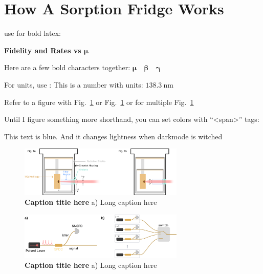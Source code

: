 \documentclass[11pt]{caltech_thesis} %
\begin{document}
\hypertarget{how-a-sorption-fridge-works}{%
\section{How A Sorption Fridge
Works}\label{how-a-sorption-fridge-works}}

use \boldsymbol for bold latex:

\textbf{Fidelity and Rates vs \(\boldsymbol \mu\)}

Here are a few bold characters together:
\(\boldsymbol{\mu \quad \beta \quad \gamma}\)

For units, use : This is a number with units:
\(138.3~\mathrm{nm}\)

Refer to a figure with Fig.~\ref{fig:figurename} or
Fig.~\ref{fig:figurename} or for multiple Fig.~\ref{fig:figurename}

Until I figure something more shorthand, you can set colors with
``\textless span\textgreater{}'' tags:

{\color{midnightblue}  This text is blue. And it changes lightness when
darkmode is witched }

\hypertarget{fig:figurename}{%
\begin{figure}
\centering
\includegraphics[width=0.7\textwidth,height=\textheight]{chapter_05/figs_05/fig1b_light.pdf}
\caption[{Figure label for in thesis index here.}]{\textbf{Caption title
here} a) Long caption here}
\label{fig:figurename}
\end{figure}
}

\hypertarget{fig:figurename2}{%
\begin{figure}
\centering
\includegraphics[width=0.7\textwidth,height=\textheight]{chapter_05/figs_05/hsps_light.pdf}
\caption[{Figure label for in thesis index here.}]{\textbf{Caption title
here} a) Long caption here}
\label{fig:figurename2}
\end{figure}
}
\end{document}
